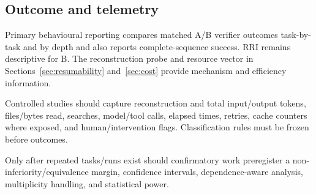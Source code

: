 \subsection{Outcome and telemetry}

Primary behavioural reporting compares matched A/B verifier outcomes task-by-task and by depth and also reports complete-sequence success. RRI remains descriptive for B. The reconstruction probe and resource vector in Sections~\ref{sec:resumability} and~\ref{sec:cost} provide mechanism and efficiency information.

Controlled studies should capture reconstruction and total input/output tokens, files/bytes read, searches, model/tool calls, elapsed times, retries, cache counters where exposed, and human/intervention flags. Classification rules must be frozen before outcomes.

Only after repeated tasks/runs exist should confirmatory work preregister a non-inferiority/equivalence margin, confidence intervals, dependence-aware analysis, multiplicity handling, and statistical power.
